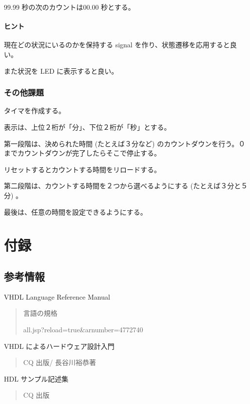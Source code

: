 \documentclass[letterpaper,10pt,dvipdfmx]{sphinxmanual}
\begin{document}
99.99 秒の次のカウントは00.00 秒とする。


\subsubsection{ヒント}
\label{\detokenize{05_try:id34}}
現在どの状況にいるのかを保持する signal を作り、状態遷移を応用すると良い。

また状況を LED に表示すると良い。


\subsection{その他課題}
\label{\detokenize{05_try:id35}}
タイマを作成する。

表示は、上位２桁が「分」、下位２桁が「秒」とする。

第一段階は、決められた時間 (たとえば３分など) のカウントダウンを行う。０までカウントダウンが完了したらそこで停止する。

リセットするとカウントする時間をリロードする。

第二段階は、カウントする時間を２つから選べるようにする (たとえば３分と５分) 。

最後は、任意の時間を設定できるようにする。


\chapter{付録}
\label{\detokenize{06_appendix:id1}}\label{\detokenize{06_appendix::doc}}

\section{参考情報}
\label{\detokenize{06_appendix:id2}}
VHDL Language Reference Manual
\begin{quote}

言語の規格

 all.jsp?reload=true\&arnumber=4772740
\end{quote}

VHDL によるハードウェア設計入門
\begin{quote}

CQ 出版/ 長谷川裕恭著
\end{quote}

HDL サンプル記述集
\begin{quote}

CQ 出版
\end{quote}
\end{document}
